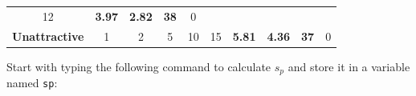 \documentclass[]{book}
\begin{document}
\begin{longtable}[]{@{}cccccccccc@{}}
\begin{minipage}[t]{0.05\columnwidth}
12\strut
\end{minipage} & \begin{minipage}[t]{0.08\columnwidth}\centering\strut
\textbf{3.97}\strut
\end{minipage} & \begin{minipage}[t]{0.08\columnwidth}\centering\strut
\textbf{2.82}\strut
\end{minipage} & \begin{minipage}[t]{0.06\columnwidth}\centering\strut
\textbf{38}\strut
\end{minipage} & \begin{minipage}[t]{0.08\columnwidth}\centering\strut
0\strut
\end{minipage}\tabularnewline
\begin{minipage}[t]{0.15\columnwidth}\centering\strut
\textbf{Unattractive}\strut
\end{minipage} & \begin{minipage}[t]{0.05\columnwidth}\centering\strut
1\strut
\end{minipage} & \begin{minipage}[t]{0.04\columnwidth}\centering\strut
2\strut
\end{minipage} & \begin{minipage}[t]{0.08\columnwidth}\centering\strut
5\strut
\end{minipage} & \begin{minipage}[t]{0.04\columnwidth}\centering\strut
10\strut
\end{minipage} & \begin{minipage}[t]{0.05\columnwidth}\centering\strut
15\strut
\end{minipage} & \begin{minipage}[t]{0.08\columnwidth}\centering\strut
\textbf{5.81}\strut
\end{minipage} & \begin{minipage}[t]{0.08\columnwidth}\centering\strut
\textbf{4.36}\strut
\end{minipage} & \begin{minipage}[t]{0.06\columnwidth}\centering\strut
\textbf{37}\strut
\end{minipage} & \begin{minipage}[t]{0.08\columnwidth}\centering\strut
0\strut
\end{minipage}\tabularnewline
\bottomrule
\end{longtable}

Start with typing the following command to calculate \(s_p\) and store
it in a variable named \texttt{sp}:
\end{document}
